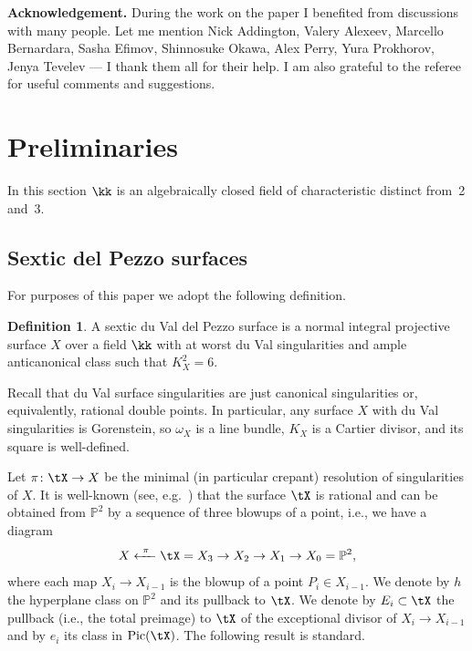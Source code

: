 \documentclass[11pt]{amsart}
\renewcommand{\P}{{\mathbb{P}}}
\DeclareMathOperator{\Pic}{\mathrm{Pic}}
\theoremstyle{plain}
\theoremstyle{definition}
\newtheorem{definition}[theorem]{Definition}
\theoremstyle{remark}
\begin{document}

{\bf Acknowledgement.}
During the work on the paper I benefited from discussions with many people.
Let me mention 
Nick Addington,
Valery Alexeev, 
Marcello Bernardara,
Sasha Efimov,
Shinnosuke Okawa, 
Alex Perry, 
Yura Prokhorov,
Jenya Tevelev
--- I thank them all for their help.
I am also grateful to the referee for useful comments and suggestions.



\section{Preliminaries}
\label{section:preliminaries}

In this section $\kk$ is an algebraically closed field of characteristic distinct from~2 and~3.

\subsection{Sextic del Pezzo surfaces}
\label{subsection:dp6}

For purposes of this paper we adopt the following definition.

\begin{definition}\label{definition:dp6}
A {\sf sextic du Val del Pezzo surface} is a normal integral projective surface $X$ over a field $\kk$ with at worst du Val singularities and ample anticanonical class such that $K_X^2 = 6$.
\end{definition}

Recall that du Val surface singularities are just canonical singularities or, equivalently, rational double points.
In particular, any surface $X$ with du Val singularities is Gorenstein, so $\omega_X$ is a line bundle, $K_X$ is a Cartier divisor, and its square is well-defined.

Let $\pi \colon \tX \to X$ be the minimal (in particular crepant) resolution of singularities of $X$.
It is well-known (see, e.g.~\cite[Section~8.4.2]{dolgachev2012cag}) that the surface $\tX$ is rational and can be obtained from $\P^2$ by a sequence of three blowups of a point, i.e., we have a diagram
\begin{equation*}
X \xleftarrow{\ \pi\ } \tX = X_3 \to X_2 \to X_1 \to X_0 = \P^2,
\end{equation*}
where each map $X_i \to X_{i-1}$ is the blowup of a point $P_i \in X_{i-1}$.
We denote by $h$ the hyperplane class on $\P^2$ and its pullback to $\tX$.
We denote by $E_i \subset \tX$ the pullback (i.e., the total preimage) to $\tX$ of the exceptional divisor of $X_i \to X_{i-1}$ and by $e_i$ its class in $\Pic(\tX)$.
The following result is standard.
\end{document}
